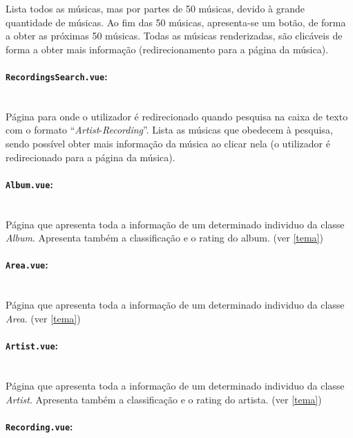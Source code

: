 \documentclass{article}
\begin{document}
Lista todos as músicas, mas por partes de 50 músicas, devido à grande quantidade de músicas. Ao fim das 50 músicas, apresenta-se um botão, de forma a obter as próximas 50 músicas. Todas as músicas renderizadas, são clicáveis de forma a obter mais informação (redirecionamento para a página da música).

\paragraph{\texttt{RecordingsSearch.vue}:}\mbox{}\\

Página para onde o utilizador é redirecionado quando pesquisa na caixa de texto com o formato ``\textit{Artist}-\textit{Recording}''. Lista as músicas que obedecem à pesquisa, sendo possível obter mais informação da música ao clicar nela (o utilizador é redirecionado para a página da música).

\paragraph{\texttt{Album.vue}:}\mbox{}\\

Página que apresenta toda a informação de um determinado individuo da classe \textit{Album}. Apresenta também a classificação e o rating do album. (ver \ref{tema})

\paragraph{\texttt{Area.vue}:}\mbox{}\\

Página que apresenta toda a informação de um determinado individuo da classe \textit{Area}. (ver \ref{tema})

\paragraph{\texttt{Artist.vue}:}\mbox{}\\

Página que apresenta toda a informação de um determinado individuo da classe \textit{Artist}. Apresenta também a classificação e o rating do artista. (ver \ref{tema})

\paragraph{\texttt{Recording.vue}:}\mbox{}\\
\end{document}
